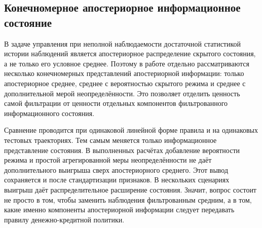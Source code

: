\subsection{Конечномерное апостериорное информационное состояние}
В задаче управления при неполной наблюдаемости достаточной статистикой истории наблюдений является апостериорное распределение скрытого состояния, а не только его условное среднее. Поэтому в работе отдельно рассматриваются несколько конечномерных представлений апостериорной информации: только апостериорное среднее, среднее с вероятностью скрытого режима и среднее с дополнительной мерой неопределённости. Это позволяет отделить ценность самой фильтрации от ценности отдельных компонентов фильтрованного информационного состояния.

Сравнение проводится при одинаковой линейной форме правила и на одинаковых тестовых траекториях. Тем самым меняется только информационное представление состояния. В выполненных расчётах добавление вероятности режима и простой агрегированной меры неопределённости не даёт дополнительного выигрыша сверх апостериорного среднего. Этот вывод сохраняется и после стандартизации признаков. В нескольких сценариях выигрыш даёт распределительное расширение состояния. Значит, вопрос состоит не просто в том, чтобы заменить наблюдения фильтрованным средним, а в том, какие именно компоненты апостериорной информации следует передавать правилу денежно-кредитной политики.